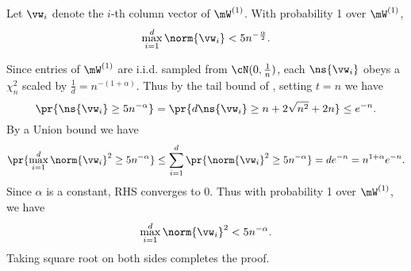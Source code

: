 \begin{lemma}
\label{lemma:w1-col-norm}
Let $\vw_i$ denote the $i$-th column vector of $\mW^{(1)}$.
With probability 1 over $\mW^{(1)}$, \begin{equation}
    \max_{i=1}^d\norm{\vw_i}<5n^{-\frac\alpha2}.
\end{equation}

\end{lemma}
\begin{proofof}{}
Since entries of $\mW^{(1)}$ are i.i.d. sampled from $\cN(0, \frac1n)$, each $\ns{\vw_i}$ obeys a $\chi_n^2$ scaled by $\frac1d = n^{-(1+\alpha)}$. Thus by the tail bound of , setting $t=n$ we have\begin{equation}
\pr{\ns{\vw_i}\geq 5n^{-\alpha}} =  \pr{d\ns{\vw_i}\geq n+2\sqrt{n^2}+2n}\leq e^{-n}.
\end{equation}
By a Union bound we have \begin{equation}
    \pr{ \max_{i=1}^d\norm{\vw_i}^2\geq 5n^{-\alpha}}\leq \sum_{i=1}^d\pr{ \norm{\vw_i}^2\geq 5n^{-\alpha}} = de^{-n} = n^{1+\alpha}e^{-n}.
\end{equation}
Since $\alpha$ is a constant, RHS converges to 0. Thus with probability 1 over $\mW^{(1)}$, we have \begin{equation}
    \max_{i=1}^d\norm{\vw_i}^2<5n^{-\alpha}.
\end{equation}
Taking square root on both sides completes the proof.
\end{proofof}

